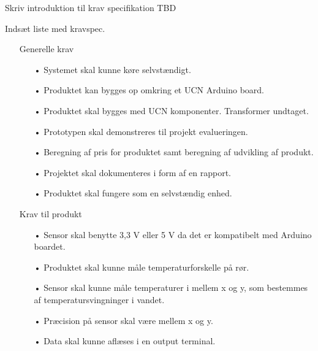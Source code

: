Skriv introduktion til krav specifikation TBD

Indsæt liste med kravspec.
\begin{enumerate}
\item[]Generelle krav
\begin{enumerate}
	\item[•]Systemet skal kunne køre selvstændigt.
	\item[•]Produktet kan bygges op omkring et UCN Arduino board. 
	\item[•]Produktet skal bygges med UCN komponenter. Transformer undtaget.
	\item[•]Prototypen skal demonstreres til projekt evalueringen. 
	\item[•]Beregning af pris for produktet samt beregning af udvikling af       produkt.
	\item[•]Projektet skal dokumenteres i form af en rapport.
	\item[•]Produktet skal fungere som en selvstændig enhed.
\end{enumerate}	

\item[]Krav til produkt
\begin{enumerate}
	\item[•]Sensor skal benytte 3,3 V eller 5 V da det er kompatibelt med Arduino boardet.
	\item[•]Produktet skal kunne måle temperaturforskelle på rør.
	\item[•]Sensor skal kunne måle temperaturer i mellem x og y, som bestemmes af temperatursvingninger i vandet.
	\item[•]Præcision på sensor skal være mellem x og y.
	\item[•]Data skal kunne aflæses i en output terminal.
\end{enumerate}	
\end{enumerate}	